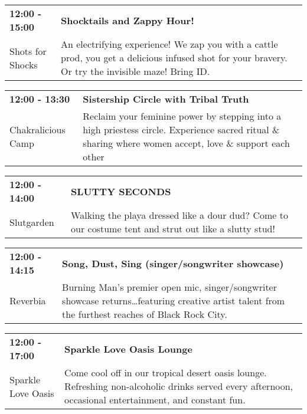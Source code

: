 \begin{tabular}{ p{1in} p{2.2in} }
    \textbf{12:00 - 15:00} & \textbf{Shocktails and Zappy Hour! } \\
    Shots for Shocks \newline  & An electrifying experience! We zap you with a cattle prod, you get a delicious infused shot for your bravery. Or try the invisible maze! Bring ID. \\
    \hline 
\end{tabular}
    
\begin{tabular}{ p{1in} p{2.2in} }
    \textbf{12:00 - 13:30} & \textbf{Sistership Circle with Tribal Truth} \\
    Chakralicious Camp \newline  & Reclaim your feminine power by stepping into a high priestess circle. Experience sacred ritual \& sharing where women accept, love \& support each other \\
    \hline 
\end{tabular}
    
\begin{tabular}{ p{1in} p{2.2in} }
    \textbf{12:00 - 14:00} & \textbf{SLUTTY SECONDS} \\
    Slutgarden \newline  & Walking the playa dressed like a dour dud? Come to our costume tent and strut out like a slutty stud! \\
    \hline 
\end{tabular}
    
\begin{tabular}{ p{1in} p{2.2in} }
    \textbf{12:00 - 14:15} & \textbf{Song, Dust, Sing (singer/songwriter showcase)} \\
    Reverbia \newline  & Burning Man's premier open mic, singer/songwriter showcase returns\ldots featuring creative artist talent from the furthest reaches of Black Rock City. \\
    \hline 
\end{tabular}
    
\begin{tabular}{ p{1in} p{2.2in} }
    \textbf{12:00 - 17:00} & \textbf{Sparkle Love Oasis Lounge} \\
    Sparkle Love Oasis \newline  & Come cool off in our tropical desert oasis lounge. Refreshing non-alcoholic drinks served every afternoon, occasional entertainment, and constant fun. \\
    \hline 
\end{tabular}
    

